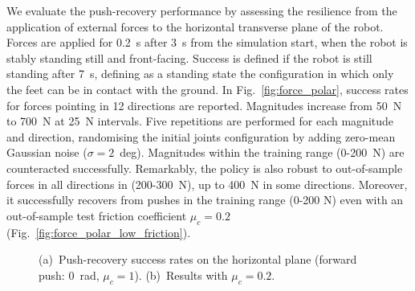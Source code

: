 We evaluate the push-recovery performance by assessing the resilience from the application of external forces to the horizontal transverse plane of the robot.
Forces are applied for 0.2~s after 3~s from the simulation start, when the robot is stably standing still and front-facing.
Success is defined if the robot is still standing after 7~s, defining as a standing state the configuration in which only the feet can be in contact with the ground.
In Fig.~\ref{fig:force_polar}, success rates for forces pointing in 12 directions are reported.
Magnitudes increase from 50~N to 700~N at 25~N intervals.
Five repetitions are performed for each magnitude and direction, randomising the initial joints configuration by adding zero-mean Gaussian noise ($\sigma = 2$~deg).
Magnitudes within the training range (0-200~N) are counteracted successfully.
Remarkably, the policy is also robust to out-of-sample forces in all directions in (200-300~N), up to 400~N in some directions.
Moreover, it successfully recovers from pushes in the training range (0-200 N) even with an out-of-sample test friction coefficient $\mu_c=0.2$ (Fig.~\ref{fig:force_polar_low_friction}).

\begin{figure}
    \centering
    \hspace{-7mm}
    \caption{(a)~Push-recovery success rates on the horizontal plane (forward push: $0$~rad, $\mu_c=1$). (b)~Results with  $\mu_c=0.2$.}
\end{figure}

